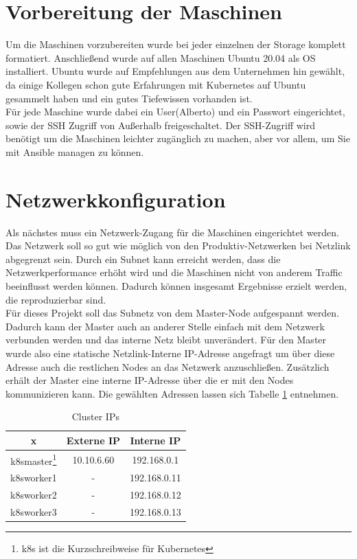 \section{Vorbereitung der Maschinen}
Um die Maschinen vorzubereiten wurde bei jeder einzelnen der Storage komplett formatiert.
Anschließend wurde auf allen Maschinen Ubuntu 20.04 als \ac{OS} installiert.
Ubuntu wurde auf Empfehlungen aus dem Unternehmen hin gewählt, da einige Kollegen schon gute Erfahrungen mit Kubernetes auf Ubuntu gesammelt haben und ein gutes Tiefewissen vorhanden ist.
\\
Für jede Maschine wurde dabei ein User(Alberto) und ein Passwort eingerichtet, sowie der \ac{SSH} Zugriff von Außerhalb freigeschaltet.
Der SSH-Zugriff wird benötigt um die Maschinen leichter zugänglich zu machen, aber vor allem, um Sie mit Ansible managen zu können.


\section{Netzwerkkonfiguration}
Als nächstes muss ein Netzwerk-Zugang für die Maschinen eingerichtet werden.
Das Netzwerk soll so gut wie möglich von den Produktiv-Netzwerken bei Netzlink abgegrenzt sein.
Durch ein Subnet kann erreicht werden, dass die Netzwerkperformance erhöht wird und die Maschinen nicht von anderem Traffic beeinflusst werden können.
Dadurch können insgesamt Ergebnisse erzielt werden, die reproduzierbar sind. 
\\
Für dieses Projekt soll das Subnetz von dem Master-Node aufgespannt werden. 
Dadurch kann der Master auch an anderer Stelle einfach mit dem Netzwerk verbunden werden und das interne Netz bleibt unverändert.
Für den Master wurde also eine statische Netzlink-Interne \ac{IP}-Adresse angefragt um über diese Adresse auch die restlichen Nodes an das Netzwerk anzuschließen.
Zusätzlich erhält der Master eine interne \ac{IP}-Adresse über die er mit den Nodes kommunizieren kann.
Die gewählten Adressen lassen sich Tabelle \ref{table:katanetes_ips} entnehmen.

\begin{table}
    \centering
    \begin{tabular}[h!]{ c | c c }
        x & Externe \ac{IP} & Interne \ac{IP} \\
        \hline
        k8smaster\footnote{k8s ist die Kurzschreibweise für Kubernetes} & 10.10.6.60 & 192.168.0.1 \\
        k8sworker1 & - & 192.168.0.11 \\
        k8sworker2 & - & 192.168.0.12 \\
        k8sworker3 & - & 192.168.0.13 \\
    \end{tabular}
    \caption{Cluster IPs}
    \label{table:katanetes_ips}
\end{table}

